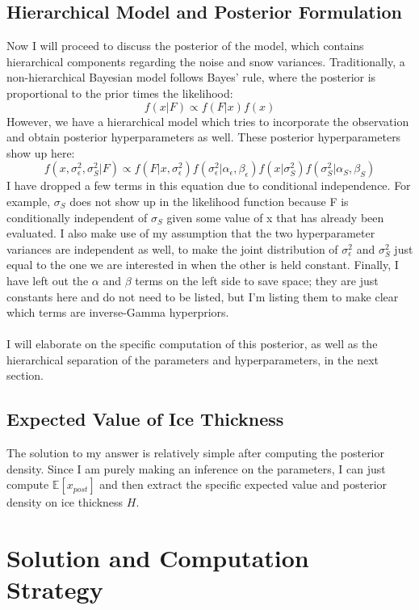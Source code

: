 \documentclass[12pt, letterpaper]{article}
\begin{document}
\subsection{Hierarchical Model and Posterior Formulation}
Now I will proceed to discuss the posterior of the model, which contains hierarchical components regarding the noise and snow variances.
Traditionally, a non-hierarchical Bayesian model follows Bayes' rule, where the posterior is proportional to the prior times the likelihood:
\[
    f(x | F) \propto f(F | x) f(x)
\]
However, we have a hierarchical model which tries to incorporate the observation and obtain posterior hyperparameters as well.
These posterior hyperparameters show up here:
\[
    f(x, \sigma^2_\epsilon, \sigma^2_S | F) \propto f(F | x, \sigma^2_\epsilon) f(\sigma^2_\epsilon | \alpha_\epsilon, \beta_\epsilon)
    f(x | \sigma^2_S) f(\sigma^2_S | \alpha_S, \beta_S)
\]
I have dropped a few terms in this equation due to conditional independence. For example, $\sigma_S$ does not show up
in the likelihood function because F is conditionally independent of $\sigma_S$ given some value of x that has already been evaluated.
I also make use of my assumption that the two hyperparameter variances are independent as well, to make the joint distribution of
$\sigma^2_\epsilon$ and $\sigma^2_S$ just equal to the one we are interested in when the other is held constant.
Finally, I have left out the $\alpha$ and $\beta$ terms on the left side to save space; they are just constants here
and do not need to be listed, but I'm listing them to make clear which terms are inverse-Gamma hyperpriors.
\\\\
I will elaborate on the specific computation of this posterior, as well as the hierarchical separation of the parameters and hyperparameters,
in the next section.

\subsection{Expected Value of Ice Thickness}
The solution to my answer is relatively simple after computing the posterior density. Since I am purely making an inference on the parameters,
I can just compute $\mathbb{E}[x_{post}]$ and then extract the specific expected value and posterior density on ice thickness $H$.

\newpage
\section{Solution and Computation Strategy}
\end{document}
